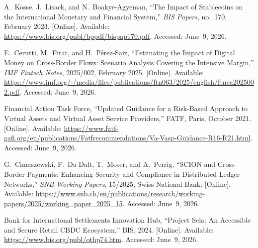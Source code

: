 \documentclass[12pt,a4paper]{report}
\begin{document}
{\begin{enumerate}[label={[\arabic*]}]
\item A.~Kosse, J.~Lisack, and N.~Boakye-Agyeman, ``The Impact of Stablecoins on the International Monetary and Financial System,'' \textit{BIS Papers}, no.~170, February 2023. [Online]. Available: \url{https://www.bis.org/publ/bppdf/bispap170.pdf}. Accessed: June~9, 2026.

\item E.~Cerutti, M.~Firat, and H.~P\'{e}rez-Saiz, ``Estimating the Impact of Digital Money on Cross-Border Flows: Scenario Analysis Covering the Intensive Margin,'' \textit{IMF Fintech Notes}, 2025/002, February 2025. [Online]. Available: \url{https://www.imf.org/-/media/files/publications/ftn063/2025/english/ftnea2025002.pdf}. Accessed: June~9, 2026.

\item Financial Action Task Force, ``Updated Guidance for a Risk-Based Approach to Virtual Assets and Virtual Asset Service Providers,'' FATF, Paris, October 2021. [Online]. Available: \url{https://www.fatf-gafi.org/en/publications/Fatfrecommendations/Va-Vasp-Guidance-R16-R21.html}. Accessed: June~9, 2026.

\item G.~Cimaszewski, F.~Da Dalt, T.~Moser, and A.~Perrig, ``SCION and Cross-Border Payments: Enhancing Security and Compliance in Distributed Ledger Networks,'' \textit{SNB Working Papers}, 15/2025, Swiss National Bank. [Online]. Available: \url{https://www.snb.ch/en/publications/research/working-papers/2025/working_paper_2025_15}. Accessed: June~9, 2026.
\item Bank for International Settlements Innovation Hub, ``Project Sela: An Accessible and Secure Retail CBDC Ecosystem,'' BIS, 2024. [Online]. Available: \url{https://www.bis.org/publ/othp74.htm}. Accessed: June~9, 2026.

\end{enumerate}
}
\end{document}
